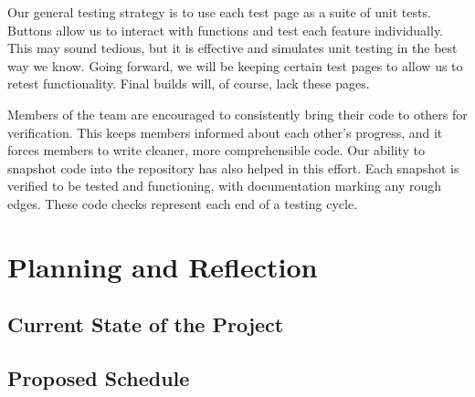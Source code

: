 \documentclass[12pt]{article}
\begin{document}
Our general testing strategy is to use each test page as a suite of unit tests.  Buttons allow us to interact with functions and test each feature individually.  This may sound tedious, but it is effective and simulates unit testing in the best way we know.  Going forward, we will be keeping certain test pages to allow us to retest functionality.  Final builds will, of course, lack these pages.

Members of the team are encouraged to consistently bring their code to others for verification.  This keeps members informed about each other's progress, and it forces members to write cleaner, more comprehensible code.  Our ability to snapshot code into the repository has also helped in this effort.  Each snapshot is verified to be tested and functioning, with documentation marking any rough edges.  These code checks represent each end of a testing cycle.


\section{Planning and Reflection}
\subsection{Current State of the Project}


\subsection{Proposed Schedule}



\newpage


\end{document}
